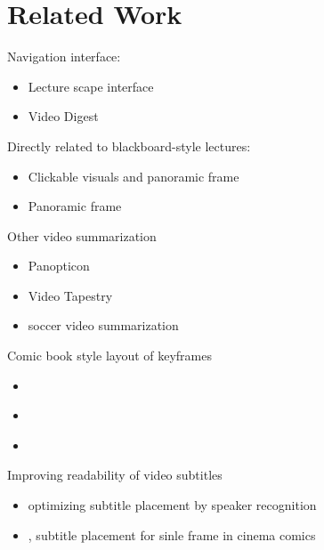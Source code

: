 \section{Related Work}

Navigation interface:
\begin{itemize}
\item \cite{kim2014data} Lecture scape interface
\item \cite{pavel2014video} Video Digest
\end{itemize}
Directly related to blackboard-style lectures:
\begin{itemize}
\item \cite{monserrat2013notevideo} Clickable visuals and panoramic frame
\item \cite{choudary2007summarization} Panoramic frame
\end{itemize}
Other video summarization
\begin{itemize}
\item \cite{jackson2013panopticon} Panopticon
\item \cite{barnes2010video} Video Tapestry
\item \cite{ekin2003automatic} soccer video summarization
\end{itemize}
Comic book style layout of keyframes
\begin{itemize}
\item \cite{boreczky2000interactive}
\item \cite{uchihashi1999video} 
\item \cite{hwang2006cinema}
\end{itemize}
Improving readability of video subtitles
\begin{itemize}
\item \cite{hu2015speaker} optimizing subtitle placement by speaker recognition
\item \cite{kurlander1996comic}, \cite{chun2006automated} subtitle placement for sinle frame in cinema comics
\end{itemize}


